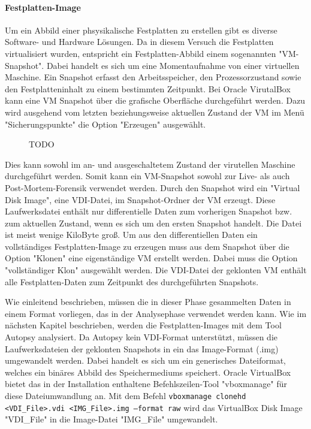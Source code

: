 \paragraph*{Festplatten-Image}
Um ein Abbild einer phsysikalische Festplatten zu erstellen gibt es diverse Software- und Hardware Lösungen. 
Da in diesem Versuch die Festplatten virtualisiert wurden, entspricht ein Festplatten-Abbild einem sogenannten "VM-Snapshot".
Dabei handelt es sich um eine Momentaufnahme von einer virtuellen Maschine. Ein Snapshot erfasst den Arbeitsspeicher, den Prozessorzustand sowie den Festplatteninhalt zu einem bestimmten Zeitpunkt. %
Bei Oracle VirutalBox kann eine VM Snapshot über die grafische Oberfläche durchgeführt werden.
Dazu wird ausgehend vom letzten beziehungsweise aktuellen Zustand der VM im Menü "Sicherungspunkte" die Option "Erzeugen" ausgewählt.
\begin{figure}[h!]
	\caption{TODO}
\end{figure}
Dies kann sowohl im an- und ausgeschaltetem Zustand der virutellen Maschine durchgeführt werden. Somit kann ein VM-Snapshot sowohl zur Live- als auch Post-Mortem-Forensik verwendet werden.
Durch den Snapshot wird ein "Virtual Disk Image", eine VDI-Datei, im Snapshot-Ordner der VM erzeugt. Diese Laufwerksdatei enthält nur differentielle Daten zum vorherigen Snapshot bzw. zum aktuellen Zustand, wenn es sich um den ersten Snapshot handelt. Die Datei ist meist wenige KiloByte groß.
Um aus den differentiellen Daten ein vollständiges Festplatten-Image zu erzeugen muss aus dem Snapshot über die Option "Klonen" eine eigenständige VM erstellt werden. 
Dabei muss die Option "vollständiger Klon" ausgewählt werden. Die VDI-Datei der geklonten VM enthält alle Festplatten-Daten zum Zeitpunkt des durchgeführten Snapshots.

Wie einleitend beschrieben, müssen die in dieser Phase gesammelten Daten in einem Format vorliegen, das in der Analysephase verwendet werden kann.
Wie im nächsten Kapitel beschrieben, werden die Festplatten-Images mit dem Tool Autopsy analysiert.
Da Autopsy kein VDI-Format unterstützt, müssen die Laufwerksdateien der geklonten Snapshots in ein das Image-Format (.img) umgewandelt werden.
Dabei handelt es sich um ein generisches Dateiformat, welches ein binäres Abbild des Speichermediums speichert. 
Oracle VirtualBox bietet das in der Installation enthaltene Befehlszeilen-Tool "vboxmanage" für diese Dateiumwandlung an. Mit dem Befehl \texttt{vboxmanage clonehd <VDI\_File>.vdi <IMG\_File>.img --format raw} wird das VirtualBox Disk Image "VDI\_File" in die Image-Datei "IMG\_File" umgewandelt.

